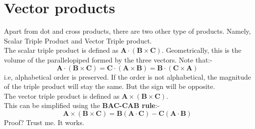 \documentclass[12pt]{article}
\begin{document}
\section{Vector products}
Apart from dot and cross products, there are two other type of products. Namely, Scalar Triple Product and Vector Triple product. \\
The scalar triple product is defined as $\mathbf{A}\cdot(\mathbf{B}\times\mathbf{C})$. Geometrically, this is the volume of the parallelopiped formed by the three vectors.
Note that:-
\begin{equation}
    \mathbf{A}\cdot(\mathbf{B}\times\mathbf{C})=\mathbf{C}\cdot(\mathbf{A}\times\mathbf{B})=\mathbf{B}\cdot(\mathbf{C}\times\mathbf{A})
\end{equation}
i.e, alphabetical order is preserved. If the order is not alphabetical, the magnitude of the triple product will stay the same. But the sign will be opposite.
\\ The vector triple product is defined as $\mathbf{A}\times(\mathbf{B}\times\mathbf{C})$.\\
This can be simplified using the \textbf{BAC-CAB rule}:-
\begin{equation}
    \mathbf{A}\times(\mathbf{B}\times\mathbf{C})=\mathbf{B}(\mathbf{A}\cdot\mathbf{C})-\mathbf{C}(\mathbf{A}\cdot\mathbf{B})
\end{equation}
Proof? Trust me. It works.
\end{document}
